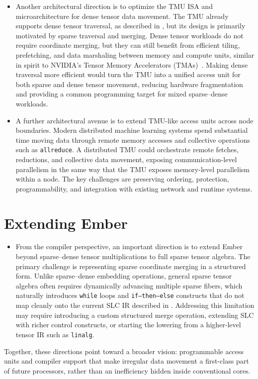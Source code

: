 \begin{itemize}
    \item Another architectural direction is to optimize the TMU ISA and microarchitecture for dense tensor data movement. The TMU already supports dense tensor traversal, as described in , but its design is primarily motivated by sparse traversal and merging. Dense tensor workloads do not require coordinate merging, but they can still benefit from efficient tiling, prefetching, and data marshaling between memory and compute units, similar in spirit to NVIDIA's Tensor Memory Accelerators (TMAs)~\cite{nvidia2022hopper}. Making dense traversal more efficient would turn the TMU into a unified access unit for both sparse and dense tensor movement, reducing hardware fragmentation and providing a common programming target for mixed sparse--dense workloads.

    \item A further architectural avenue is to extend TMU-like access units across node boundaries. Modern distributed machine learning systems spend substantial time moving data through remote memory accesses and collective operations such as \texttt{allreduce}. A distributed TMU could orchestrate remote fetches, reductions, and collective data movement, exposing communication-level parallelism in the same way that the TMU exposes memory-level parallelism within a node. The key challenges are preserving ordering, protection, programmability, and integration with existing network and runtime systems.
\end{itemize}

\section{Extending Ember} \label{sec:future-work-extending-ember}

\begin{itemize}
    \item From the compiler perspective, an important direction is to extend Ember beyond sparse--dense tensor multiplications to full sparse tensor algebra. The primary challenge is representing sparse coordinate merging in a structured form. Unlike sparse--dense embedding operations, general sparse tensor algebra often requires dynamically advancing multiple sparse fibers, which naturally introduces \texttt{while} loops and \texttt{if--then--else} constructs that do not map cleanly onto the current SLC IR described in . Addressing this limitation may require introducing a custom structured merge operation, extending SLC with richer control constructs, or starting the lowering from a higher-level tensor IR such as \texttt{linalg}.
\end{itemize}

Together, these directions point toward a broader vision: programmable access units and compiler support that make irregular data movement a first-class part of future processors, rather than an inefficiency hidden inside conventional cores.
